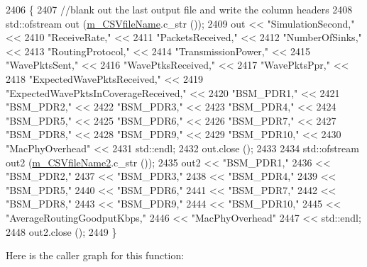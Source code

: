 \begin{DoxyCode}
2406 \{
2407   \textcolor{comment}{//blank out the last output file and write the column headers}
2408   std::ofstream out (\hyperlink{classVanetRoutingExperiment_a0fab315c81d7da9e59216c3790f55da4}{m\_CSVfileName}.c\_str ());
2409   out << \textcolor{stringliteral}{"SimulationSecond,"} <<
2410     \textcolor{stringliteral}{"ReceiveRate,"} <<
2411     \textcolor{stringliteral}{"PacketsReceived,"} <<
2412     \textcolor{stringliteral}{"NumberOfSinks,"} <<
2413     \textcolor{stringliteral}{"RoutingProtocol,"} <<
2414     \textcolor{stringliteral}{"TransmissionPower,"} <<
2415     \textcolor{stringliteral}{"WavePktsSent,"} <<
2416     \textcolor{stringliteral}{"WavePtksReceived,"} <<
2417     \textcolor{stringliteral}{"WavePktsPpr,"} <<
2418     \textcolor{stringliteral}{"ExpectedWavePktsReceived,"} <<
2419     \textcolor{stringliteral}{"ExpectedWavePktsInCoverageReceived,"} <<
2420     \textcolor{stringliteral}{"BSM\_PDR1,"} <<
2421     \textcolor{stringliteral}{"BSM\_PDR2,"} <<
2422     \textcolor{stringliteral}{"BSM\_PDR3,"} <<
2423     \textcolor{stringliteral}{"BSM\_PDR4,"} <<
2424     \textcolor{stringliteral}{"BSM\_PDR5,"} <<
2425     \textcolor{stringliteral}{"BSM\_PDR6,"} <<
2426     \textcolor{stringliteral}{"BSM\_PDR7,"} <<
2427     \textcolor{stringliteral}{"BSM\_PDR8,"} <<
2428     \textcolor{stringliteral}{"BSM\_PDR9,"} <<
2429     \textcolor{stringliteral}{"BSM\_PDR10,"} <<
2430     \textcolor{stringliteral}{"MacPhyOverhead"} <<
2431     std::endl;
2432   out.close ();
2433 
2434   std::ofstream out2 (\hyperlink{classVanetRoutingExperiment_a8ad342a946c50fa946eeb20fddfd2adc}{m\_CSVfileName2}.c\_str ());
2435   out2 << \textcolor{stringliteral}{"BSM\_PDR1,"}
2436        << \textcolor{stringliteral}{"BSM\_PDR2,"}
2437        << \textcolor{stringliteral}{"BSM\_PDR3,"}
2438        << \textcolor{stringliteral}{"BSM\_PDR4,"}
2439        << \textcolor{stringliteral}{"BSM\_PDR5,"}
2440        << \textcolor{stringliteral}{"BSM\_PDR6,"}
2441        << \textcolor{stringliteral}{"BSM\_PDR7,"}
2442        << \textcolor{stringliteral}{"BSM\_PDR8,"}
2443        << \textcolor{stringliteral}{"BSM\_PDR9,"}
2444        << \textcolor{stringliteral}{"BSM\_PDR10,"}
2445        << \textcolor{stringliteral}{"AverageRoutingGoodputKbps,"}
2446        << \textcolor{stringliteral}{"MacPhyOverhead"}
2447        << std::endl;
2448   out2.close ();
2449 \}
\end{DoxyCode}


Here is the caller graph for this function\+:




